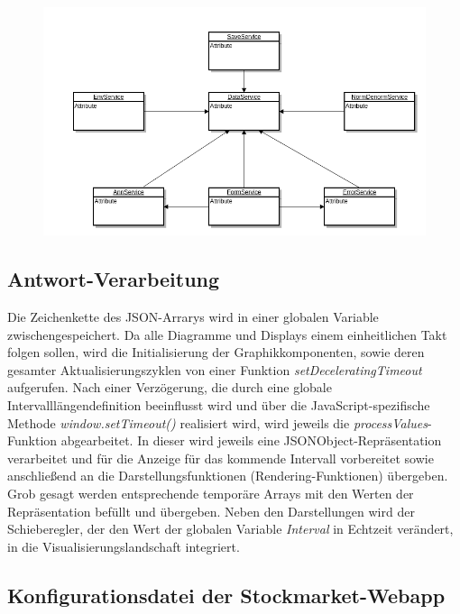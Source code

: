 \begin{figure}
\includegraphics[width=15cm]{sequence_dia_service_layer.png}
\end{figure}


\subsection{Antwort-Verarbeitung}
Die Zeichenkette des JSON-Arrarys wird in einer globalen Variable zwischengespeichert. Da alle Diagramme und Displays einem einheitlichen Takt folgen sollen, wird die Initialisierung der Graphikkomponenten, sowie deren gesamter Aktualisierungszyklen von einer Funktion \emph{setDeceleratingTimeout} aufgerufen. Nach einer Verzögerung, die durch eine globale Intervalllängendefinition beeinflusst wird und über die JavaScript-spezifische Methode \emph{window.setTimeout()} realisiert wird, wird jeweils die \emph{processValues}-Funktion abgearbeitet. In dieser wird jeweils eine JSONObject-Repräsentation verarbeitet und für die Anzeige für das kommende Intervall vorbereitet sowie anschließend an die Darstellungsfunktionen (Rendering-Funktionen) übergeben. Grob gesagt werden entsprechende temporäre Arrays mit den Werten der Repräsentation befüllt und übergeben. Neben den Darstellungen wird der Schieberegler, der den Wert der globalen Variable \emph{Interval} in Echtzeit verändert, in die Visualisierungslandschaft integriert. 

\subsection{Konfigurationsdatei der Stockmarket-Webapp}

